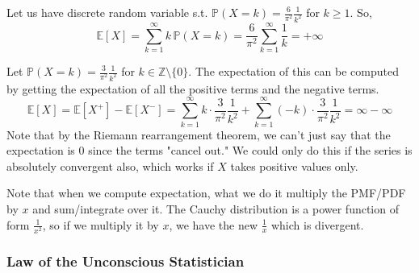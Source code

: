   \begin{example}
    Let us have discrete random variable s.t. $\mathbb{P}(X = k) = \frac{6}{\pi^2} \frac{1}{k^2}$ for $k \geq 1$. So, 
    \begin{equation}
      \mathbb{E}[X] = \sum_{k=1}^\infty k \, \mathbb{P}(X = k) = \frac{6}{\pi^2} \sum_{k=1}^\infty \frac{1}{k} = +\infty
    \end{equation}
  \end{example}

  \begin{example}
    Let $\mathbb{P}(X = k) = \frac{3}{\pi^2} \frac{1}{k^2}$ for $k \in \mathbb{Z}\setminus \{0\}$. The expectation of this can be computed by getting the expectation of all the positive terms and the negative terms. 
    \begin{equation}
      \mathbb{E}[X] = \mathbb{E}[X^+] - \mathbb{E}[X^{-}] = \sum_{k=1}^\infty k \cdot \frac{3}{\pi^2} \frac{1}{k^2} + \sum_{k=1}^\infty (-k) \cdot \frac{3}{\pi^2} \frac{1}{k^2} = \infty - \infty
    \end{equation}
    Note that by the Riemann rearrangement theorem, we can't just say that the expectation is $0$ since the terms "cancel out." We could only do this if the series is absolutely convergent also, which works if $X$ takes positive values only. 
  \end{example}

  Note that when we compute expectation, what we do it multiply the PMF/PDF by $x$ and sum/integrate over it. The Cauchy distribution is a power function of form $\frac{1}{x^2}$, so if we multiply it by $x$, we have the new $\frac{1}{x}$ which is divergent. 

  \subsubsection{Law of the Unconscious Statistician}

